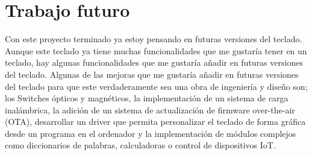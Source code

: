 \section{Trabajo futuro}
Con este proyecto terminado ya estoy pensando en futuras versiones del teclado. Aunque este teclado ya tiene muchas funcionalidades que me gustaría tener en un teclado, hay algunas funcionalidades que me gustaría añadir en futuras versiones del teclado. Algunas de las mejoras que me gustaría añadir en futuras versiones del teclado para que este verdaderamente sea una obra de ingeniería y diseño son; los \gls{Switches} ópticos y magnéticos, la implementación de un sistema de carga inalámbrica, la adición de un sistema de actualización de firmware over-the-air (OTA), desarrollar un driver que permita personalizar el teclado de forma gráfica desde un programa en el ordenador y la implementación de módulos complejos como diccionarios de palabras, calculadoras o control de dispositivos IoT.